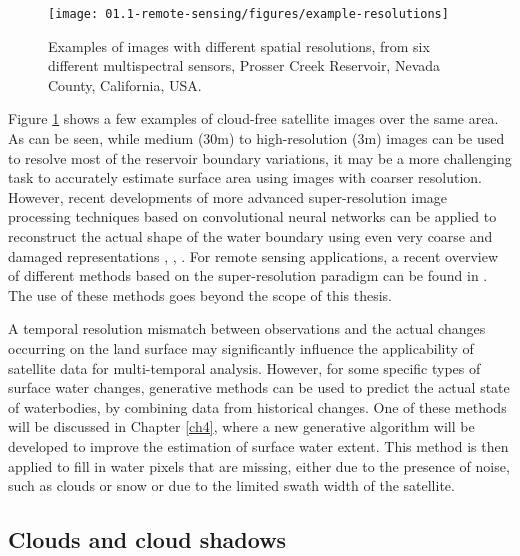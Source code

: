 \begin{figure}
	\texttt{[image: 01.1-remote-sensing/figures/example-resolutions]}
	\caption{Examples of images with different spatial resolutions, from six different multispectral sensors, Prosser Creek Reservoir, Nevada County, California, USA. }
	\label{fig:example-resolutions}
\end{figure}

Figure \ref{fig:example-resolutions} shows a few examples of cloud-free satellite images over the same area. As can be seen, while medium (30m) to high-resolution (3m) images can be used to resolve most of the reservoir boundary variations, it may be a more challenging task to accurately estimate surface area using images with coarser resolution. However, recent developments of more advanced super-resolution image processing techniques based on convolutional neural networks can be applied to reconstruct the actual shape of the water boundary using even very coarse and damaged representations \citet{ledig2016photo}, \citet{shi2016real}, \citet{johnson2016perceptual}. For remote sensing applications, a recent overview of different methods based on the super-resolution paradigm can be found in \citet{garzelli2016review}. The use of these methods goes beyond the scope of this thesis.

A temporal resolution mismatch between observations and the actual changes occurring on the land surface may significantly influence the applicability of satellite data for multi-temporal analysis. However, for some specific types of surface water changes, generative methods can be used to predict the actual state of waterbodies, by combining data from historical changes. One of these methods will be discussed in Chapter \ref{ch4}, where a new generative algorithm will be developed to improve the estimation of surface water extent. This method is then applied to fill in water pixels that are missing, either due to the presence of noise, such as clouds or snow or due to the limited swath width of the satellite.

\subsection{Clouds and cloud shadows}

